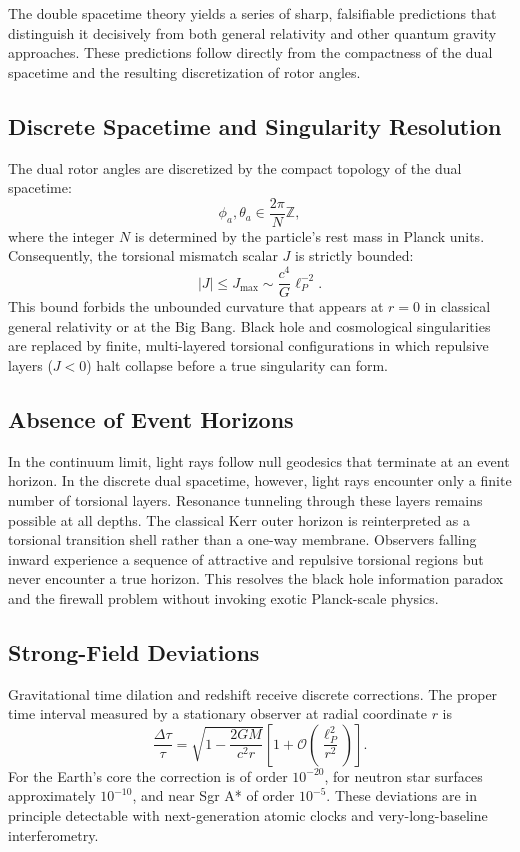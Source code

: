 \documentclass[dvipdfmx,11pt,a4paper]{article}
\begin{document}
The double spacetime theory yields a series of sharp, falsifiable predictions that distinguish it decisively from both general relativity and other quantum gravity approaches. These predictions follow directly from the compactness of the dual spacetime and the resulting discretization of rotor angles.

\subsection{Discrete Spacetime and Singularity Resolution}

The dual rotor angles are discretized by the compact topology of the dual spacetime:
\[
\phi_a, \theta_a \in \frac{2\pi}{N}\mathbb{Z},
\]
where the integer $N$ is determined by the particle's rest mass in Planck units. Consequently, the torsional mismatch scalar $J$ is strictly bounded:
\[
|J| \leq J_\text{max} \sim \frac{c^4}{G} \ell_P^{-2}.
\]
This bound forbids the unbounded curvature that appears at $r=0$ in classical general relativity or at the Big Bang. Black hole and cosmological singularities are replaced by finite, multi-layered torsional configurations in which repulsive layers ($J < 0$) halt collapse before a true singularity can form.

\subsection{Absence of Event Horizons}

In the continuum limit, light rays follow null geodesics that terminate at an event horizon. In the discrete dual spacetime, however, light rays encounter only a finite number of torsional layers. Resonance tunneling through these layers remains possible at all depths. The classical Kerr outer horizon is reinterpreted as a torsional transition shell rather than a one-way membrane. Observers falling inward experience a sequence of attractive and repulsive torsional regions but never encounter a true horizon. This resolves the black hole information paradox and the firewall problem without invoking exotic Planck-scale physics.

\subsection{Strong-Field Deviations}

Gravitational time dilation and redshift receive discrete corrections. The proper time interval measured by a stationary observer at radial coordinate $r$ is
\[
\frac{\Delta\tau}{\tau} = \sqrt{1 - \frac{2GM}{c^2 r}} \left[ 1 + \mathcal{O}\left( \frac{\ell_P^2}{r^2} \right) \right].
\]
For the Earth’s core the correction is of order $10^{-20}$, for neutron star surfaces approximately $10^{-10}$, and near Sgr A* of order $10^{-5}$. These deviations are in principle detectable with next-generation atomic clocks and very-long-baseline interferometry.
\end{document}
